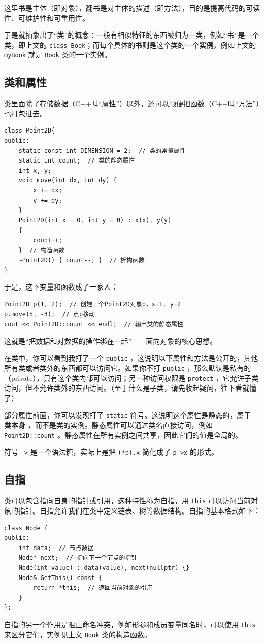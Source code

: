 这里书是主体（即对象），翻书是对主体的描述（即方法），目的是提高代码的可读性、可维护性和可重用性。

于是就抽象出了“类”的概念：一般有相似特征的东西被归为一类，例如“书”是一个类，即上文的 \verb|class Book|；而每个具体的书则是这个类的一个\textbf{实例}，例如上文的 \verb|myBook| 就是 \verb|Book| 类的一个实例。

\subsection{类和属性}

类里面除了存储数据（C++叫“属性”）以外，还可以顺便把函数（C++叫“方法”）也打包进去。
\begin{verbatim}
class Point2D{
public:
    static const int DIMENSION = 2;  // 类的常量属性
    static int count;  // 类的静态属性
    int x, y;
    void move(int dx, int dy) {
        x += dx;
        y += dy;
    }
    Point2D(int x = 0, int y = 0) : x(x), y(y)
    {
        count++;
    }  // 构造函数
    ~Point2D() { count--; }  // 析构函数
}
\end{verbatim}
于是，这下变量和函数成了一家人：
\begin{verbatim}
Point2D p(1, 2);  // 创建一个Point2D对象p，x=1, y=2
p.move(5, -3);  // 点p移动
cout << Point2D::count << endl;  // 输出类的静态属性
\end{verbatim}
这就是“把数据和对数据的操作绑在一起”——面向对象的核心思想。

在类中，你可以看到我打了一个 \texttt{public} ，这说明以下属性和方法是公开的，其他所有类或者类外的东西都可以访问它。如果你不打 \texttt{public} ，那么默认是私有的（private），只有这个类内部可以访问；另一种访问权限是 \texttt{protect} ，它允许子类访问，但不允许类外的东西访问。（至于什么是子类，请先收起疑问，往下看就懂了）

部分属性前面，你可以发现打了 \texttt{static} 符号。这说明这个属性是静态的，属于 \textbf{类本身} ，而不是类的实例。静态属性可以通过类名直接访问，例如 \texttt{Point2D::count} 。静态属性在所有实例之间共享，因此它们的值是全局的。

符号 \texttt{->} 是一个语法糖，实际上是把 \texttt{(*p).x} 简化成了 \texttt{p->x} 的形式。

\subsection{自指}

类可以包含指向自身的指针或引用，这种特性称为自指，用 \texttt{this} 可以访问当前对象的指针。自指允许我们在类中定义链表、树等数据结构。自指的基本格式如下：
\begin{verbatim}
class Node {
public:
    int data;  // 节点数据
    Node* next;  // 指向下一个节点的指针
    Node(int value) : data(value), next(nullptr) {}
    Node& GetThis() const {
        return *this;  // 返回当前对象的引用
    }
};
\end{verbatim}
自指的另一个作用是阻止命名冲突，例如形参和成员变量同名时，可以使用 \texttt{this} 来区分它们，实例见上文 \texttt{Book} 类的构造函数。

